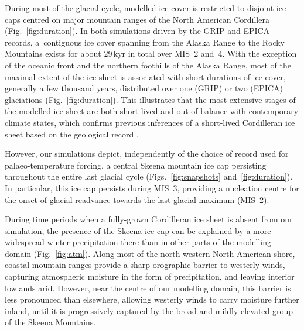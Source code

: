 \documentclass[tc, manuscript]{copernicus}
\begin{document}
During most of the glacial cycle, modelled ice cover is restricted to disjoint
ice caps centred on major mountain ranges of the North American Cordillera
(Fig.~\ref{fig:duration}). In both simulations driven by the GRIP and EPICA
records, a~contiguous ice cover spanning from the Alaska Range to the Rocky
Mountains exists for about 29\,kyr in total over MIS~2 and~4.
With the exception of the oceanic front and the northern foothills of the Alaska
Range, most of the maximal extent of the ice sheet is associated with short
durations of ice cover, generally a few thousand years, distributed over one
(GRIP) or two (EPICA) glaciations (Fig.~\ref{fig:duration}). This illustrates
that the most extensive stages of the modelled ice sheet are both short-lived
and out of balance with contemporary climate states, which confirms previous
inferences of a short-lived Cordilleran ice sheet based on the geological
record \citep{Clague.etal.1980, Stroeven.etal.2010}.

However, our simulations depict, independently of the choice of record used for
palaeo-temperature forcing, a central Skeena mountain ice cap persisting
throughout the entire last glacial cycle (Figs.~\ref{fig:snapshots}
and~\ref{fig:duration}). In particular, this ice cap persists during MIS~3,
providing a nucleation centre for the onset of glacial
readvance towards the last glacial maximum (MIS~2).

During time periods when a fully-grown Cordilleran ice sheet is absent from our
simulation, the presence of the Skeena ice cap can be explained by a more
widespread winter precipitation there than in other parts of the modelling
domain (Fig.~\ref{fig:atm}). Along most of the north-western North American
shore, coastal mountain ranges provide a sharp orographic barrier to westerly
winds, capturing atmospheric moisture in the form of precipitation, and leaving
interior lowlands arid. However, near the centre of our modelling domain, this
barrier is less pronounced than
elsewhere, allowing westerly winds to carry moisture further inland, until it
is progressively captured by the broad and mildly elevated group of the Skeena
Mountains.
\end{document}
